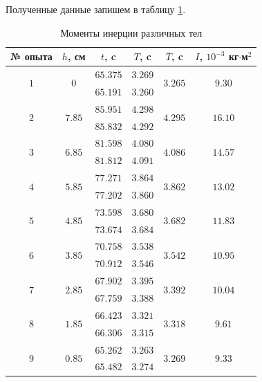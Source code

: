 \documentclass[a4paper,12pt]{article}
\begin{document}
\begin{enumerate}
	Полученные данные запишем в таблицу \ref{tab:position}.
	\begin{table}[h!]
		\centering
		\begin{tabular}{|c|c|c|c|c|c|} \hline
			№ опыта 			  & $h$, см 				 & $t$, c 	& $T$, c  & $\overline{T}$, c 		 & $I$, $10^{-3}$ кг$\cdot$м$^2$ \\ \hline
			\multirow{2}{*}{$1$}  & \multirow{2}{*}{$0$} 	 & $65.375$ & $3.269$ & \multirow{2}{*}{$3.265$} & \multirow{2}{*}{$9.30$} 		 \\ 
								  & 	    			 	 & $65.191$ & $3.260$ & 						 \\ \hline
			\multirow{2}{*}{$2$}  & \multirow{2}{*}{$7.85$}  & $85.951$ & $4.298$ & \multirow{2}{*}{$4.295$} & \multirow{2}{*}{$16.10$}		 \\ 
			 	    			  &						 	 & $85.832$ & $4.292$ & 						 \\ \hline
			\multirow{2}{*}{$3$}  & \multirow{2}{*}{$6.85$}  & $81.598$ & $4.080$ & \multirow{2}{*}{$4.086$} & \multirow{2}{*}{$14.57$}		 \\ 
			 	    			  &						 	 & $81.812$ & $4.091$ & 						 \\ \hline
			\multirow{2}{*}{$4$}  & \multirow{2}{*}{$5.85$}  & $77.271$ & $3.864$ & \multirow{2}{*}{$3.862$} & \multirow{2}{*}{$13.02$} 	 \\ 
								  &						 	 & $77.202$ & $3.860$ & 						 \\ \hline
			\multirow{2}{*}{$5$}  & \multirow{2}{*}{$4.85$}  & $73.598$ & $3.680$ & \multirow{2}{*}{$3.682$} & \multirow{2}{*}{$11.83$}		 \\ 
								  &						 	 & $73.674$ & $3.684$ & 						 \\ \hline
			\multirow{2}{*}{$6$}  & \multirow{2}{*}{$3.85$}  & $70.758$ & $3.538$ & \multirow{2}{*}{$3.542$} & \multirow{2}{*}{$10.95$}		 \\ 
								  &						 	 & $70.912$ & $3.546$ & 						 \\ \hline
			\multirow{2}{*}{$7$}  & \multirow{2}{*}{$2.85$}  & $67.902$ & $3.395$ & \multirow{2}{*}{$3.392$} & \multirow{2}{*}{$10.04$}		 \\ 
								  &						 	 & $67.759$ & $3.388$ & 						 \\ \hline
			\multirow{2}{*}{$8$}  & \multirow{2}{*}{$1.85$}  & $66.423$ & $3.321$ & \multirow{2}{*}{$3.318$} & \multirow{2}{*}{$9.61$}		 \\ 
								  &						 	 & $66.306$ & $3.315$ & 						 \\ \hline
			\multirow{2}{*}{$9$}  & \multirow{2}{*}{$0.85$}  & $65.262$ & $3.263$ & \multirow{2}{*}{$3.269$} & \multirow{2}{*}{$9.33$}		 \\ 
								  &						 	 & $65.482$ & $3.274$ & 						 \\ \hline
		\end{tabular}
		\caption{Моменты инерции различных тел}
		\label{tab:position}				
	\end{table}


\end{enumerate}
\end{document}

